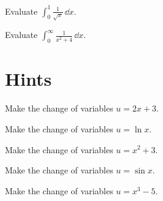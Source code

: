 \begin{Exercise}
  \label{exercise int 0 1 1 / sqrt x}
  Evaluate $\int_0^1 \frac{1}{\sqrt{x}} \,\dd x$.

\end{Exercise}




\begin{Exercise}
  \label{exercise int 0 infty 1 / x2+4}
  Evaluate $\int_0^\infty \frac{1}{x^2+4} \,\dd x$.

\end{Exercise}












\raggedbottom
\pagebreak
\flushbottom
\section{Hints}





\begin{Hint}
  \label{hint int 2x+3 10}
  Make the change of variables $u = 2 x+3$.
\end{Hint}


\begin{Hint}
  \label{hint int ln x 2 / x}
  Make the change of variables $u = \ln x$.
\end{Hint}



\begin{Hint}
  \label{hint int x sqrt x2+3}
  Make the change of variables $u = x^2 + 3$.
\end{Hint}


\begin{Hint}
  \label{hint int cos x / sin x}
  Make the change of variables $u = \sin x$.
\end{Hint}


\begin{Hint}
  \label{hint int x2 / x3-5}
  Make the change of variables $u = x^3 - 5$.
\end{Hint}




